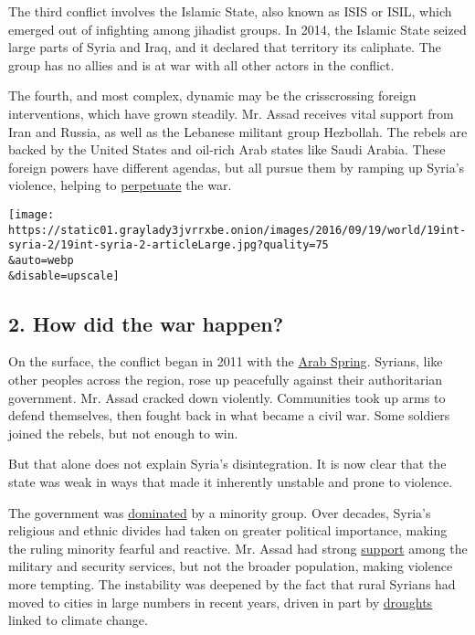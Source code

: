The third conflict involves the Islamic State, also known as ISIS or
ISIL, which emerged out of infighting among jihadist groups. In 2014,
the Islamic State seized large parts of Syria and Iraq, and it declared
that territory its caliphate. The group has no allies and is at war with
all other actors in the conflict.

The fourth, and most complex, dynamic may be the crisscrossing foreign
interventions, which have grown steadily. Mr. Assad receives vital
support from Iran and Russia, as well as the Lebanese militant group
Hezbollah. The rebels are backed by the United States and oil-rich Arab
states like Saudi Arabia. These foreign powers have different agendas,
but all pursue them by ramping up Syria's violence, helping to
\href{http://www.nytimes3xbfgragh.onion/2016/08/27/world/middleeast/syria-civil-war-why-get-worse.html?hp\&action=click\&pgtype=Homepage\&clickSource=story-heading\&module=first-column-region\&region=top-news\&WT.nav=top-news\&_r=2}{perpetuate}
the war.

\texttt{[image: https://static01.graylady3jvrrxbe.onion/images/2016/09/19/world/19int-syria-2/19int-syria-2-articleLarge.jpg?quality=75\\\&auto=webp\\\&disable=upscale]}

\hypertarget{2-how-did-the-war-happen}{%
\subsection{\texorpdfstring{\textbf{2. How did the war
happen?}}{2. How did the war happen?}}\label{2-how-did-the-war-happen}}

On the surface, the conflict began in 2011 with the
\href{http://www.nytimes3xbfgragh.onion/slideshow/2011/12/25/sunday-review/25YIP_ARABSPRING.html?action=click\&contentCollection=Opinion\&module=RelatedCoverage\&region=EndOfArticle\&pgtype=article}{Arab
Spring}. Syrians, like other peoples across the region, rose up
peacefully against their authoritarian government. Mr. Assad cracked
down violently. Communities took up arms to defend themselves, then
fought back in what became a civil war. Some soldiers joined the rebels,
but not enough to win.

But that alone does not explain Syria's disintegration. It is now clear
that the state was weak in ways that made it inherently unstable and
prone to violence.

The government was
\href{http://www.nytimes3xbfgragh.onion/2012/06/10/world/middleeast/syrian-alawites-divided-by-assads-response-to-unrest.html?_r=0}{dominated}
by a minority group. Over decades, Syria's religious and ethnic divides
had taken on greater political importance, making the ruling minority
fearful and reactive. Mr. Assad had strong
\href{http://www.vox.com/2015/11/5/9671746/syria-assad-military-loyal}{support}
among the military and security services, but not the broader
population, making violence more tempting. The instability was deepened
by the fact that rural Syrians had moved to cities in large numbers in
recent years, driven in part by
\href{http://www.nytimes3xbfgragh.onion/2015/03/03/science/earth/study-links-syria-conflict-to-drought-caused-by-climate-change.html}{droughts}
linked to climate change.

